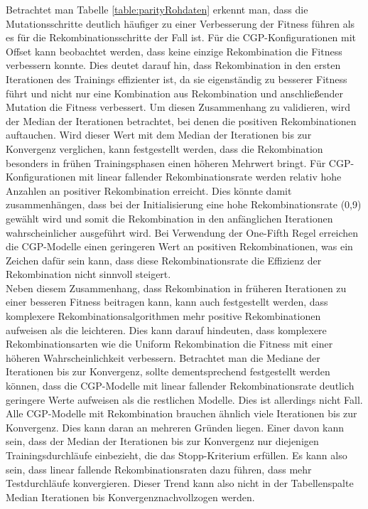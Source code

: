 Betrachtet man Tabelle \ref{table:parityRohdaten} erkennt man, dass die Mutationsschritte deutlich häufiger zu einer Verbesserung der Fitness führen als es für die Rekombinationsschritte der Fall ist.
Für die CGP-Konfigurationen mit Offset kann beobachtet werden, dass keine einzige Rekombination die Fitness verbessern konnte. 
Dies deutet darauf hin, dass Rekombination in den ersten Iterationen des Trainings effizienter ist, da sie eigenständig zu besserer Fitness führt und nicht nur eine Kombination aus Rekombination und anschließender Mutation die Fitness verbessert.
Um diesen Zusammenhang zu validieren, wird der Median der Iterationen betrachtet, bei denen die positiven Rekombinationen auftauchen.
Wird dieser Wert mit dem Median der Iterationen bis zur Konvergenz verglichen, kann festgestellt werden, dass die Rekombination besonders in frühen Trainingsphasen einen höheren Mehrwert bringt.
Für CGP-Konfigurationen mit linear fallender Rekombinationsrate werden relativ hohe Anzahlen an positiver Rekombination erreicht.
Dies könnte damit zusammenhängen, dass bei der Initialisierung eine hohe Rekombinationsrate (0,9) gewählt wird und somit die Rekombination in den anfänglichen Iterationen wahrscheinlicher ausgeführt wird.
Bei Verwendung der One-Fifth Regel erreichen die CGP-Modelle einen geringeren Wert an positiven Rekombinationen, was ein Zeichen dafür sein kann, dass diese Rekombinationsrate die Effizienz der Rekombination nicht sinnvoll steigert.\\
Neben diesem Zusammenhang, dass Rekombination in früheren Iterationen zu einer besseren Fitness beitragen kann, kann auch festgestellt werden, dass komplexere Rekombinationsalgorithmen mehr positive Rekombinationen aufweisen als die leichteren.
Dies kann darauf hindeuten, dass komplexere Rekombinationsarten wie die Uniform Rekombination die Fitness mit einer höheren Wahrscheinlichkeit verbessern.
Betrachtet man die Mediane der Iterationen bis zur Konvergenz, sollte dementsprechend festgestellt werden können, dass die CGP-Modelle mit linear fallender Rekombinationsrate deutlich geringere Werte aufweisen als die restlichen Modelle.
Dies ist allerdings nicht Fall.
Alle CGP-Modelle mit Rekombination brauchen ähnlich viele Iterationen bis zur Konvergenz.
Dies kann daran an mehreren Gründen liegen.
Einer davon kann sein, dass der Median der Iterationen bis zur Konvergenz nur diejenigen Trainingsdurchläufe einbezieht, die das Stopp-Kriterium erfüllen. 
Es kann also sein, dass linear fallende Rekombinationsraten dazu führen, dass mehr Testdurchläufe konvergieren.
Dieser Trend kann also nicht in der Tabellenspalte \glqq Median Iterationen bis Konvergenz\grqq\space nachvollzogen werden.
